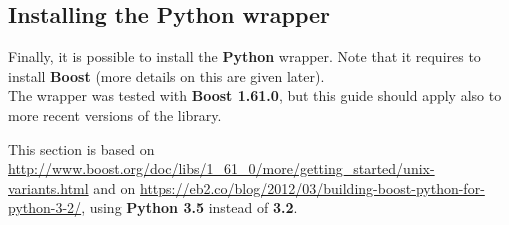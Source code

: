 \documentclass[
12pt,
a4paper,
oneside,
headinclude,
footinclude]{article}
\theoremstyle{definition} %
\begin{document}
\subsection{Installing the Python wrapper}
Finally, it is possible to install the \textbf{Python} wrapper. Note that it requires to install \textbf{Boost} (more details on this are given later).\\
The wrapper was tested with \textbf{Boost 1.61.0}, but this guide should apply also to more recent versions of the library.

This section is based on \href{http://www.boost.org/doc/libs/1\_61\_0/more/getting\_started/unix-variants.html}{http://www.boost.org/doc/libs/1\_61\_0/more/getting\_started/unix-variants.html}
and on \href{https://eb2.co/blog/2012/03/building-boost-python-for-python-3-2/}{https://eb2.co/blog/2012/03/building-boost-python-for-python-3-2/}, using \textbf{Python 3.5} instead of \textbf{3.2}.
\end{document}
